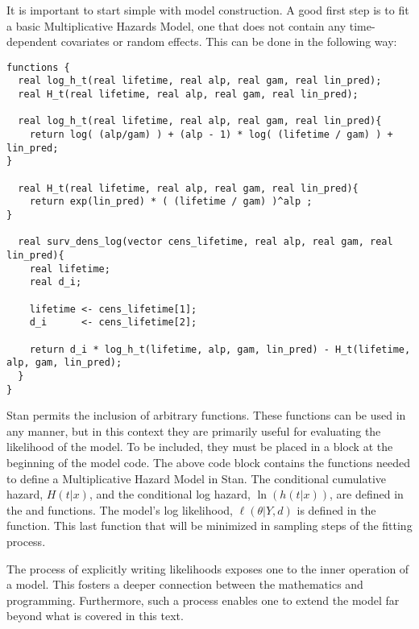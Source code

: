 It is important to start simple with model construction. A good first step is to fit a basic Multiplicative Hazards Model, one that does not contain any time-dependent covariates or random effects. This can be done in the following way:




\begin{lstlisting}
functions {
  real log_h_t(real lifetime, real alp, real gam, real lin_pred);
  real H_t(real lifetime, real alp, real gam, real lin_pred);

  real log_h_t(real lifetime, real alp, real gam, real lin_pred){
    return log( (alp/gam) ) + (alp - 1) * log( (lifetime / gam) ) + lin_pred;
}

  real H_t(real lifetime, real alp, real gam, real lin_pred){
    return exp(lin_pred) * ( (lifetime / gam) )^alp ;
}

  real surv_dens_log(vector cens_lifetime, real alp, real gam, real lin_pred){
    real lifetime;
    real d_i;
  
    lifetime <- cens_lifetime[1];
    d_i      <- cens_lifetime[2];
    
    return d_i * log_h_t(lifetime, alp, gam, lin_pred) - H_t(lifetime, alp, gam, lin_pred);
  }
}
\end{lstlisting}


Stan permits the inclusion of arbitrary functions. These functions can be used in any manner, but in this context they are primarily useful for evaluating the likelihood of the model. To be included, they must be placed in a  block at the beginning of the model code. The above code block contains the functions needed to define a Multiplicative Hazard Model in Stan. The conditional cumulative hazard, $H(t|x)$, and the conditional log hazard, $\ln(h(t|x))$, are defined in the  and  functions. The model's log likelihood, $\ell(\theta|Y, d)$ is defined in the  function. This last function that will be minimized in sampling steps of the fitting process. 

The process of explicitly writing likelihoods exposes one to the inner operation of a model. This fosters a deeper connection between the mathematics and programming. Furthermore, such a process enables one to extend the model far beyond what is covered in this text.

